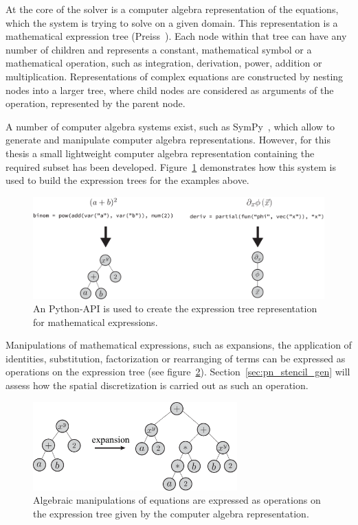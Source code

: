 At the core of the solver is a computer algebra representation of the equations, which the system is trying to solve on a given domain. This representation is a mathematical expression tree (Preiss~\cite{Preiss00}). Each node within that tree can have any number of children and represents a constant, mathematical symbol or a mathematical operation, such as integration, derivation, power, addition or multiplication. Representations of complex equations are constructed by nesting nodes into a larger tree, where child nodes are considered as arguments of the operation, represented by the parent node.

A number of computer algebra systems exist, such as SymPy~\cite{Meurer17}, which allow to generate and manipulate computer algebra representations. However, for this thesis a small lightweight computer algebra representation containing the required subset has been developed. Figure~\ref{fig:pn_math_expression_tree_generation} demonstrates how this system is used to build the expression trees for the examples above.
\begin{figure}[h]
\centering
\includegraphics[width=1.0\textwidth]{04_pn_method/figures/fig_car_representation2.pdf}
\caption{An Python-API is used to create the expression tree representation for mathematical expressions.}
\label{fig:pn_math_expression_tree_generation}
\end{figure}

Manipulations of mathematical expressions, such as expansions, the application of identities, substitution, factorization or rearranging of terms can be expressed as operations on the expression tree (see figure~\ref{fig:pn_math_expression_tree_manipulation}). Section~\ref{sec:pn_stencil_gen} will assess how the spatial discretization is carried out as such an operation.
\begin{figure}[h]
\centering
\includegraphics[width=0.7\textwidth]{04_pn_method/figures/fig_car_expansion.pdf}
\caption{Algebraic manipulations of equations are expressed as operations on the expression tree given by the computer algebra representation.}
\label{fig:pn_math_expression_tree_manipulation}
\end{figure}

